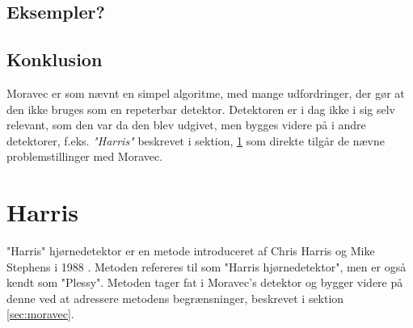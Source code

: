 \subsection*{Eksempler?}
\subsection*{Konklusion}
Moravec er som nævnt en simpel algoritme, med mange udfordringer, der gør at den ikke bruges som en repeterbar detektor. Detektoren er i dag ikke i sig selv relevant, som den var da den blev udgivet, men bygges videre på i andre detektorer, f.eks. \textit{"Harris"} beskrevet i sektion, \ref{sec:harris} som direkte tilgår de nævne problemstillinger med Moravec.
\section{Harris}\label{sec:harris}
"Harris" hjørnedetektor er en metode introduceret af Chris Harris og Mike Stephens i 1988 \cite{harris}. Metoden refereres til som "Harris hjørnedetektor", men er også kendt som "Plessy". Metoden tager fat i Moravec's detektor og bygger videre på denne ved at adressere metodens begrænsninger, beskrevet i sektion \ref{sec:moravec}.
